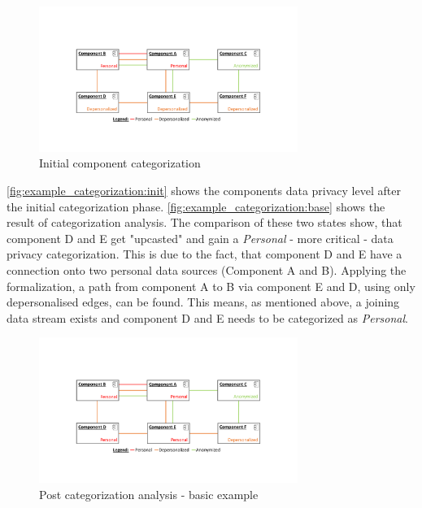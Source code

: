 \begin{figure}[h]
	\centering
	\includegraphics[trim = 35mm 40mm 40mm 45mm, clip, width=0.75\textwidth]{graphs/component_categorization_examples_initial}
	\caption{Initial component categorization}
	\label{fig:example_categorization:init}
\end{figure}

\autoref{fig:example_categorization:init} shows the components data privacy level after the initial categorization phase. \autoref{fig:example_categorization:base} shows the result of categorization analysis. The comparison of these two states show, that component D and E get "upcasted" and gain a \textit{Personal} - more critical - data privacy categorization. This is due to the fact, that component D and E have a connection onto two personal data sources (Component A and B). Applying the formalization, a path from component A to B via component E and D, using only depersonalised edges, can be found. This means, as mentioned above, a joining data stream exists and component D and E needs to be categorized as \textit{Personal}.

\begin{figure}[h]
	\centering
	\includegraphics[trim = 35mm 40mm 40mm 45mm, clip, width=0.75\textwidth]{graphs/component_categorization_examples_upcast_base}
	\caption{Post categorization analysis - basic example}
	\label{fig:example_categorization:base}
\end{figure}


